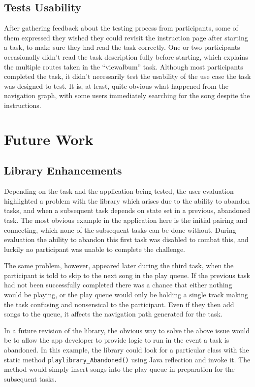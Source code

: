 \subsection{Tests Usability}

After gathering feedback about the testing process from participants,
some of them expressed they wished they
could revisit the instruction page after starting a task, to make sure they
had read the task correctly. One or two participants occasionally didn't
read the task description fully before starting, which explains the multiple
routes taken in the ``viewalbum'' task. Although most participants completed the
task, it didn't necessarily test the usability of the use case the task was designed
to test. It is, at least, quite obvious what happened from the navigation graph,
with some users immediately searching for the song despite the instructions.

\section{Future Work}

\subsection{Library Enhancements}

Depending on the task and the application being tested, the user 
evaluation highlighted a problem with the library which arises
due to the ability to abandon tasks, and when a subsequent task
depends on state set in a previous, abandoned task. The most 
obvious example in the application here is the initial pairing
and connecting, which none of the subsequent tasks can be done
without. During evaluation the ability to abandon this first task
was disabled to combat this, and luckily no participant was unable
to complete the challenge.

The same problem, however, appeared later during the third task, when
the participant is told to skip to the next song in the play queue.
If the previous task had not been successfully completed there was a
chance that either nothing would be playing, or the play queue would
only be holding a single track making the task confusing and nonsensical
to the participant. Even if they then add songs to the queue, it affects
the navigation path generated for the task.

In a future revision of the library, the obvious way to solve the above issue
would be to allow the app developer to provide logic to run in the event
a task is abandoned. In this example, the library could look for a
particular class with the static method \verb/playlibrary_Abandoned()/
using Java reflection and invoke it. The method would simply insert
songs into the play queue in preparation for the subsequent tasks.

